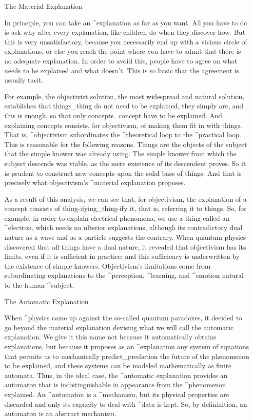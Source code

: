\Section The Material Explanation

In principle, you can take an ^{explanation} as far as you want. All you
have to do is ask why after every explanation, like children do when
they discover how. But this is very unsatisfactory, because you
necessarily end up with a vicious circle of explanations, or else you
reach the point where you have to admit that there is no adequate
explanation. In order to avoid this, people have to agree on what needs
to be explained and what doesn't. This is so basic that the agreement is
usually tacit.

For example, the objectivist solution, the most widespread and natural
solution, establishes that things_{thing} do not need to be explained,
they simply are, and this is enough, so that only concepts_{concept}
have to be explained. And explaining concepts consists, for objectivism,
of making them fit in with things. That is, ^{objectivism} subordinates
the ^{theoretical loop} to the ^{practical loop}. This is reasonable for
the following reasons. Things are the objects of the subject that the
simple knower was already using. The simple knower from which the
subject descends was viable, as the mere existence of its descendent
proves. So it is prudent to construct new concepts upon the solid base
of things. And that is precisely what objectivism's ^{material
explanation} proposes.

As a result of this analysis, we can see that, for objectivism, the
explanation of a concept consists of thing-ifying_{thing-ify} it, that
is, referring it to things. So, for example, in order to explain
electrical phenomena, we use a thing called an ^{electron}, which needs
no ulterior explanations, although its contradictory dual nature as a
wave and as a particle suggests the contrary. When quantum physics
discovered that all things have a dual nature, it revealed that
objectivism has its limits, even if it is sufficient in practice; and
this sufficiency is underwritten by the existence of simple knowers.
Objectivism's limitations come from subordinating explanations to the
^{perception}, ^{learning}, and ^{emotion} natural to the human
^{subject}.


\Section The Automatic Explanation

When ^{physics} came up against the so-called quantum paradoxes, it
decided to go beyond the material explanation devising what we will call
the automatic explanation. We give it this name not because it
automatically obtains explanations, but because it proposes as an
^{explanation} any system of equations that permits us to mechanically
predict_{prediction} the future of the phenomenon to be explained, and
these systems can be modeled mathematically as finite automata. Thus, in
the ideal case, the ^{automatic explanation} provides an automaton that
is indistinguishable in appearance from the ^{phenomenon} explained. An
^{automaton} is a ^{mechanism}, but its physical properties are
discarded and only its capacity to deal with ^{data} is kept. So, by
defininition, an automaton is an abstract mechanism.

